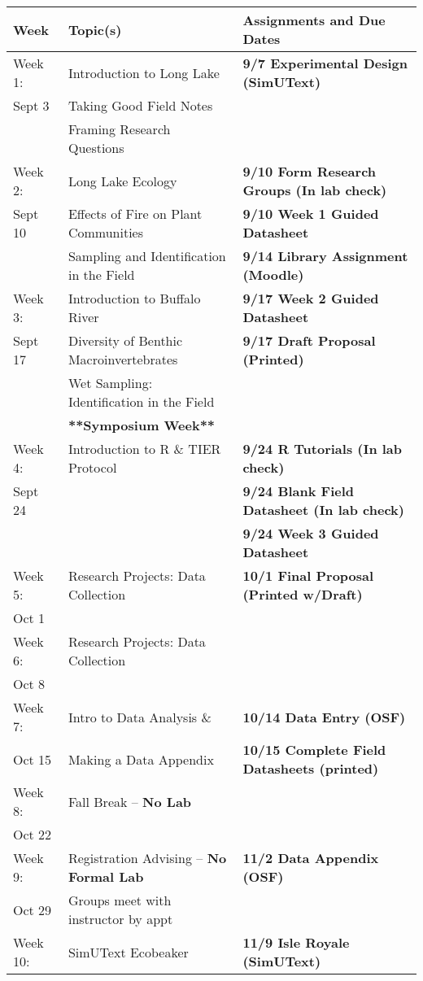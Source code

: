 \documentclass{tufte-handout}
\begin{document}
\begin{tabular}{l l l}
Week & Topic(s) & Assignments and Due Dates \\
\hline
Week 1: & Introduction to Long Lake & \textbf{9/7 Experimental Design (SimUText)} \\ 
Sept 3 & Taking Good Field Notes \\
& Framing Research Questions \\
\hline
Week 2: & Long Lake Ecology & \textbf{9/10 Form Research Groups (In lab check)} \\
Sept 10 & Effects of Fire on Plant Communities & \textbf{9/10 Week 1 Guided Datasheet}\\
& Sampling and Identification in the Field & \textbf{9/14 Library Assignment (Moodle)}\\
\hline
Week 3: & Introduction to Buffalo River & \textbf{9/17 Week 2 Guided Datasheet} \\
Sept 17 & Diversity of Benthic Macroinvertebrates & \textbf{9/17 Draft Proposal (Printed)} \\
& Wet Sampling: Identification in the Field \\
 & \textbf{**Symposium Week**} \\
\hline
Week 4: & Introduction to R \& TIER Protocol & \textbf{9/24 R Tutorials (In lab check)} \\
Sept 24 &  & \textbf{9/24 Blank Field Datasheet (In lab check)} \\
 & & \textbf{9/24 Week 3 Guided Datasheet}\\
\hline
Week 5: & Research Projects: Data Collection & \textbf{10/1 Final Proposal (Printed w/Draft)}\\
Oct 1 & & \\
\hline 
Week 6: & Research Projects: Data Collection &  \\
Oct 8 & \\
\hline 
Week 7: & Intro to Data Analysis \& &  \textbf{10/14 Data Entry (OSF)} \\
Oct 15 & Making a Data Appendix & \textbf{10/15 Complete Field Datasheets (printed)}\\
\hline
Week 8: & Fall Break -- \textbf{No Lab} & \\
Oct 22 & \\
\hline 
Week 9: & Registration Advising -- \textbf{No Formal Lab} & \textbf{11/2 Data Appendix (OSF)} \\
Oct 29 & Groups meet with instructor by appt \\
\hline 
Week 10: & SimUText Ecobeaker & \textbf{11/9 Isle Royale (SimUText)} \\

\end{tabular}
\end{document}

